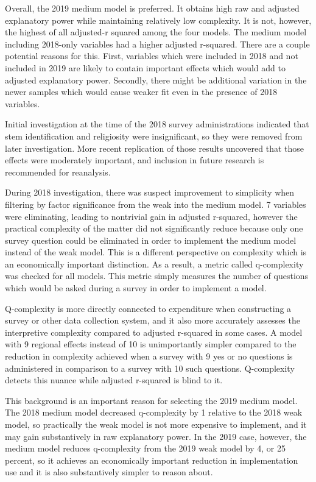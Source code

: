 \documentclass[AER]{/Users/zyl357/Documents/GitHub/research-dissertation-case-for-alt-ed/papers/alt-ed-survey/aea-latex-templates/AEA}
\begin{document}
Overall, the 2019 medium model is preferred. It obtains high raw and
adjusted explanatory power while maintaining relatively low complexity. It
is not, however, the highest of all adjusted-r squared among the four
models. The medium model including 2018-only variables had a higher
adjusted r-squared. There are a couple potential reasons for this. First,
variables which were included in 2018 and not included in 2019 are likely
to contain important effects which would add to adjusted explanatory
power. Secondly, there might be additional variation in the newer samples
which would cause weaker fit even in the presence of 2018 variables.

Initial investigation at the time of the 2018 survey administrations
indicated that stem identification and religiosity were insignificant, so
they were removed from later investigation. More recent replication of
those results uncovered that those effects were moderately important, and
inclusion in future research is recommended for reanalysis.

During 2018 investigation, there was suspect improvement to simplicity
when filtering by factor significance from the weak into the medium model.
7 variables were eliminating, leading to nontrivial gain in adjusted
r-squared, however the practical complexity of the matter did not
significantly reduce because only one survey question could be eliminated
in order to implement the medium model instead of the weak model. This is
a different perspective on complexity which is an economically important
distinction. As a result, a metric called q-complexity was checked for all
models. This metric simply measures the number of questions which would be
asked during a survey in order to implement a model.

Q-complexity is more directly connected to expenditure when constructing a
survey or other data collection system, and it also more accurately
assesses the interpretive complexity compared to adjusted r-squared in
some cases. A model with 9 regional effects instead of 10 is unimportantly
simpler compared to the reduction in complexity achieved when a survey
with 9 yes or no questions is administered in comparison to a survey with
10 such questions. Q-complexity detects this nuance while adjusted
r-squared is blind to it.

This background is an important reason for selecting the 2019 medium
model. The 2018 medium model decreased q-complexity by 1 relative to the
2018 weak model, so practically the weak model is not more expensive to
implement, and it may gain substantively in raw explanatory power. In the
2019 case, however, the medium model reduces q-complexity from the 2019
weak model by 4, or 25 percent, so it achieves an economically important
reduction in implementation use and it is also substantively simpler to
reason about.
\end{document}
